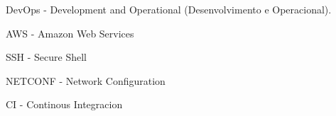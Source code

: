 
\begin{siglas}
  \item DevOps - Development and Operational (Desenvolvimento e Operacional).
  \item AWS - Amazon Web Services
  \item SSH - Secure Shell
  \item NETCONF - Network Configuration
  \item CI - Continous Integracion
\end{siglas}


\tableofcontents*
\cleardoublepage

